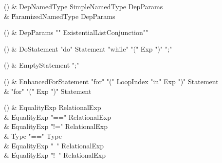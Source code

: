 \begin{bbgrammarappendix}

() & DepNamedType \label{prod:DepNamedType}  \: SimpleNamedType DepParams  \\

 &    \| ParamizedNamedType DepParams \\

\end{bbgrammarappendix}

\begin{bbgrammarappendix}

() & DepParams \label{prod:DepParams}  \: \xcd"{" ExistentialList\opt Conjunction\opt \xcd"}"  \\


\end{bbgrammarappendix}

\begin{bbgrammarappendix}

() & DoStatement \label{prod:DoStatement}  \: \xcd"do" Statement \xcd"while" \xcd"(" Exp \xcd")" \xcd";"  \\


\end{bbgrammarappendix}

\begin{bbgrammarappendix}

() & EmptyStatement \label{prod:EmptyStatement}  \: \xcd";"  \\


\end{bbgrammarappendix}

\begin{bbgrammarappendix}

() & EnhancedForStatement \label{prod:EnhancedForStatement}  \: \xcd"for" \xcd"(" LoopIndex \xcd"in" Exp \xcd")" Statement  \\

 &    \| \xcd"for" \xcd"(" Exp \xcd")" Statement \\

\end{bbgrammarappendix}

\begin{bbgrammarappendix}

() & EqualityExp \label{prod:EqualityExp}  \: RelationalExp  \\

 &    \| EqualityExp \xcd"==" RelationalExp \\
 &    \| EqualityExp \xcd"!=" RelationalExp \\
 &    \| Type  \xcd"==" Type  \\
 &    \| EqualityExp \xcd"~" RelationalExp \\
 &    \| EqualityExp \xcd"!~" RelationalExp \\

\end{bbgrammarappendix}

